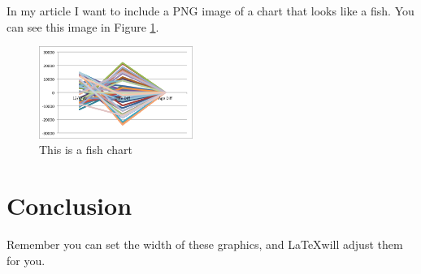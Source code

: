 \documentclass{proc}
\begin{document}
\noindent In my article I want to include a PNG image of a chart that looks like a fish. You can see this image in Figure \ref{fig:fish}.

\begin{figure}[htbp]
	\begin{center}
		\includegraphics[width=5cm]{fish.png}
		\caption{This is a fish chart}
		\label{fig:fish}		
	\end{center}
\end{figure}



\section{Conclusion}

Remember you can set the width of these graphics, and \LaTeX will adjust them for you. 
\end{document}
